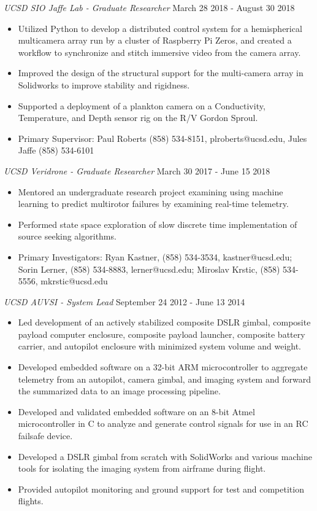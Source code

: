 \documentclass[line,margin]{res}
\begin{document}
\begin{resume}
	{\sl UCSD SIO Jaffe Lab - Graduate Researcher} \hfill March 28 2018 - August 30 2018
	\begin{itemize}
		\item Utilized Python to develop a distributed control system for a hemispherical multicamera array run by a cluster of Raspberry Pi Zeros, and created a workflow to synchronize and stitch immersive video from the camera array.
		\item Improved the design of the structural support for the multi-camera array in Solidworks to improve stability and rigidness.
		\item Supported a deployment of a plankton camera on a Conductivity, Temperature, and Depth sensor rig on the R/V Gordon Sproul.
		\item Primary Supervisor: Paul Roberts (858) 534-8151, plroberts@ucsd.edu, Jules Jaffe (858) 534-6101
	\end{itemize}

	{\sl UCSD Veridrone - Graduate Researcher} \hfill March 30 2017 - June 15 2018
	\begin{itemize}
		\item Mentored an undergraduate research project examining using machine learning to predict multirotor failures by examining real-time telemetry.
		\item Performed state space exploration of slow discrete time implementation of source seeking algorithms.
		\item Primary Investigators: Ryan Kastner, (858) 534-3534, kastner@ucsd.edu; Sorin Lerner, (858) 534-8883, lerner@ucsd.edu; Miroslav Krstic, (858) 534-5556, mkrstic@ucsd.edu
	\end{itemize}

	{\sl UCSD AUVSI - System Lead} \hfill September 24 2012 - June 13 2014
	\begin{itemize}
		\item Led development of an actively stabilized composite DSLR gimbal, composite payload computer enclosure, composite payload launcher, composite battery carrier, and autopilot enclosure with minimized system volume and weight.
		\item Developed embedded software on a 32-bit ARM microcontroller to aggregate telemetry from an autopilot, camera gimbal, and imaging system and forward the summarized data to an image processing pipeline.
		\item Developed and validated embedded software on an 8-bit Atmel microcontroller in C to analyze and generate control signals for use in an RC failsafe device.
		\item Developed a DSLR gimbal from scratch with SolidWorks and various machine tools for isolating the imaging system from airframe during flight.
		\item Provided autopilot monitoring and ground support for test and competition flights.
	\end{itemize}


\end{resume}
\end{document}
